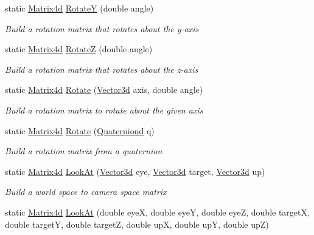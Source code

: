 \begin{DoxyCompactItemize}
static \hyperlink{struct_open_t_k_1_1_matrix4d}{Matrix4d} \hyperlink{struct_open_t_k_1_1_matrix4d_a774ad99f593f670619126d8a8644e62b}{Rotate\-Y} (double angle)
\begin{DoxyCompactList}\small\item\em Build a rotation matrix that rotates about the y-\/axis \end{DoxyCompactList}\item 
static \hyperlink{struct_open_t_k_1_1_matrix4d}{Matrix4d} \hyperlink{struct_open_t_k_1_1_matrix4d_affa99d8177476fb6e6a02aed70fb803d}{Rotate\-Z} (double angle)
\begin{DoxyCompactList}\small\item\em Build a rotation matrix that rotates about the z-\/axis \end{DoxyCompactList}\item 
static \hyperlink{struct_open_t_k_1_1_matrix4d}{Matrix4d} \hyperlink{struct_open_t_k_1_1_matrix4d_a94f5a8b3eaa9afb8ad686d6c055fed36}{Rotate} (\hyperlink{struct_open_t_k_1_1_vector3d}{Vector3d} axis, double angle)
\begin{DoxyCompactList}\small\item\em Build a rotation matrix to rotate about the given axis \end{DoxyCompactList}\item 
static \hyperlink{struct_open_t_k_1_1_matrix4d}{Matrix4d} \hyperlink{struct_open_t_k_1_1_matrix4d_a8f21d01e31de2a946357068328f029df}{Rotate} (\hyperlink{struct_open_t_k_1_1_quaterniond}{Quaterniond} q)
\begin{DoxyCompactList}\small\item\em Build a rotation matrix from a quaternion \end{DoxyCompactList}\item 
static \hyperlink{struct_open_t_k_1_1_matrix4d}{Matrix4d} \hyperlink{struct_open_t_k_1_1_matrix4d_a18a174e74baa5da6fc5314703b2ff55c}{Look\-At} (\hyperlink{struct_open_t_k_1_1_vector3d}{Vector3d} eye, \hyperlink{struct_open_t_k_1_1_vector3d}{Vector3d} target, \hyperlink{struct_open_t_k_1_1_vector3d}{Vector3d} up)
\begin{DoxyCompactList}\small\item\em Build a world space to camera space matrix \end{DoxyCompactList}\item 
static \hyperlink{struct_open_t_k_1_1_matrix4d}{Matrix4d} \hyperlink{struct_open_t_k_1_1_matrix4d_a779845cda8d91596e37ade8ac8cd6952}{Look\-At} (double eye\-X, double eye\-Y, double eye\-Z, double target\-X, double target\-Y, double target\-Z, double up\-X, double up\-Y, double up\-Z)

\end{DoxyCompactItemize}
